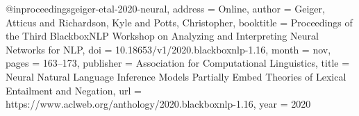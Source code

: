@inproceedings{geiger-etal-2020-neural,
	address = {Online},
	author = {Geiger, Atticus and Richardson, Kyle and Potts, Christopher},
	booktitle = {Proceedings of the Third BlackboxNLP Workshop on Analyzing and Interpreting Neural Networks for NLP},
	doi = {10.18653/v1/2020.blackboxnlp-1.16},
	month = nov,
	pages = {163--173},
	publisher = {Association for Computational Linguistics},
	title = {Neural Natural Language Inference Models Partially Embed Theories of Lexical Entailment and Negation},
	url = {https://www.aclweb.org/anthology/2020.blackboxnlp-1.16},
	year = {2020}}
